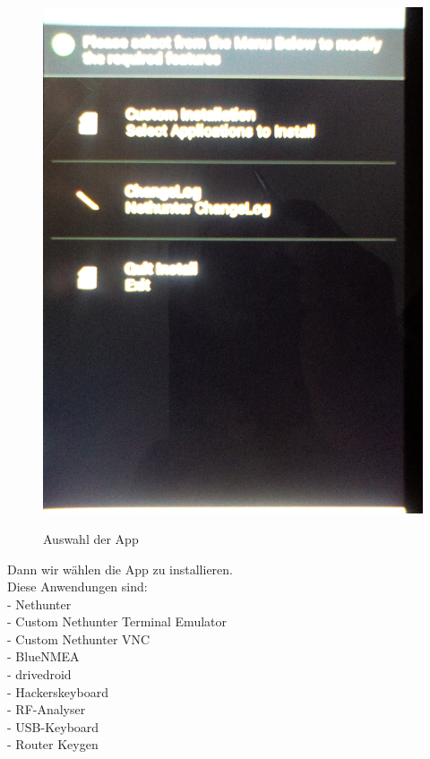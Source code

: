 \documentclass[11pt,a4paper]{article}
\begin{document}
\begin{figure}[H]
\begin{center} \includegraphics[scale=0.1]{./Image/img13}  \\
\caption{Auswahl der App}
\end{center}
\end{figure} 

Dann wir wählen die App zu installieren. \\
Diese Anwendungen sind: \\
- Nethunter \\
- Custom Nethunter Terminal Emulator \\
- Custom Nethunter VNC \\
- BlueNMEA \\
- drivedroid \\
- Hackerskeyboard \\
- RF-Analyser \\
- USB-Keyboard \\
- Router Keygen \\
\end{document}
